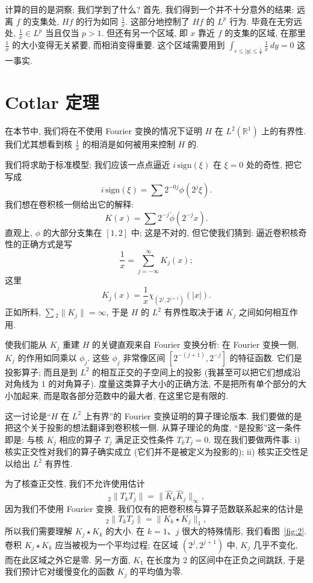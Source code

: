 \begin{remark}\label{rem:2.17}
计算的目的是洞察; 我们学到了什么? 首先, 我们得到一个并不十分意外的结果: 远离 $f$ 的支集处, $Hf$ 的行为如同 $\frac{1}{x}$. 这部分地控制了 $Hf$ 的 $L^p$ 行为. 毕竟在无穷远处, $\frac{1}{x}\in L^p$ 当且仅当 $p>1$. 但还有另一个区域, 即 $x$ 靠近 $f$ 的支集的区域, 在那里 $\frac{1}{x}$ 的大小变得无关紧要, 而相消变得重要. 这个区域需要用到 $\int_{\epsilon\leq|y|\leq\frac{1}{\epsilon}}\frac{1}{x}\,dy=0$ 这一事实.
\end{remark}

\section{Cotlar 定理}
\label{sec:2.3}

在本节中, 我们将在不使用 Fourier 变换的情况下证明 $H$ 在 $L^2(\mathbb{R}^1)$ 上的有界性. 我们尤其想看到核 $\frac{1}{x}$ 的相消是如何被用来控制 $H$ 的.

我们将求助于标准模型; 我们应该一点点逼近 $i\,\mathrm{sign}(\xi)$ 在 $\xi=0$ 处的奇性, 把它写成
\[
i\,\mathrm{sign}(\xi)=\sum 2^{-0j}\phi(2^{j}\xi).
\]
我们想在卷积核一侧给出它的解释:
\[
K(x)=\sum 2^{-j}\check{\phi}(2^{-j}x).
\]
直观上, $\phi$ 的大部分支集在 $[1,2]$ 中; 这是不对的, 但它使我们猜到: 逼近卷积核奇性的正确方式是写
\[
\frac{1}{x}=\sum_{j=-\infty}^{\infty}K_{j}(x);
\]
这里
\[
K_{j}(x)=\frac{1}{x}\chi_{(2^{j},2^{j+1})}(|x|).
\]
正如所料, $\sum{}_2\|K_j\|=\infty$, 于是 $H$ 的 $L^2$ 有界性取决于诸 $K_j$ 之间如何相互作用.

使我们能从 $K_j$ 重建 $H$ 的关键直观来自 Fourier 变换分析: 在 Fourier 变换一侧, $K_j$ 的作用如同乘以 $\phi_j$. 这些 $\phi_j$ 非常像区间 $[2^{-(j+1)},2^{-j}]$ 的特征函数. 它们是投影算子; 而且是到 $L^2$ 的相互正交的子空间上的投影 (我甚至可以把它们想成沿对角线为 $1$ 的对角算子). 度量这类算子大小的正确方法, 不是把所有单个部分的大小加起来, 而是取各部分范数中的最大者, 在这里它是有限的.

这一讨论是``$H$ 在 $L^2$ 上有界''的 Fourier 变换证明的算子理论版本. 我们要做的是把这个关于投影的想法翻译到卷积核一侧. 从算子理论的角度, ``是投影''这一条件即是: 与核 $K_j$ 相应的算子 $T_j$ 满足正交性条件 $T_kT_j=0$. 现在我们要做两件事: i) 核实正交性对我们的算子确实成立 (它们并不是被定义为投影的); ii) 核实正交性足以给出 $L^2$ 有界性.

为了核查正交性, 我们不允许使用估计
\[
{}_{2}\|T_{k}T_{j}\|=\|\hat{K}_{k}\hat{K}_{j}\|_{\infty},
\]
因为我们不使用 Fourier 变换. 我们仅有的把卷积核与算子范数联系起来的估计是
\[
{}_{2}\|T_{k}T_{j}\|=\|K_{k}\star K_{j}\|_{1},
\]
所以我们需要理解 $K_j\star K_k$ 的大小. 在 $k=1$、$j$ 很大的特殊情形, 我们看图~\ref{fig:2}. 卷积 $K_j\star K_k$ 应当被视为一个平均过程; 在区域 $(2^j,2^{j+1})$ 中, $K_j$ 几乎不变化, 而在此区域之外它是零. 另一方面, $K_1$ 在长度为 $2$ 的区间中在正负之间跳跃, 于是我们预计它对缓慢变化的函数 $K_j$ 的平均值为零.

